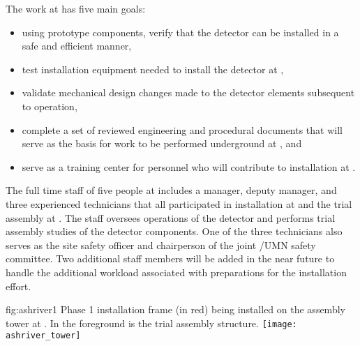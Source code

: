 The work at  has five main goals:
\begin{itemize}
  \item using prototype  components, verify that the
     detector can be installed in a safe and efficient
    manner,
    \item test installation equipment needed to install the
       detector at ,
  \item validate mechanical design changes made to the detector
    elements subsequent to  operation,
  \item complete a set of reviewed engineering and procedural
    documents that will serve as the basis for work to be performed
    underground at , and
  \item serve as a training center for personnel who will 
    contribute to   installation at .
\end{itemize}

The full time staff of five people at 
includes a manager, deputy manager, and three experienced technicians
that all participated in  installation at  and
the  trial assembly at .  The staff
oversees operations of the  detector and performs trial
assembly studies of the  detector components.  One of the
three technicians also serves as the site safety officer and
chairperson of the joint /UMN safety committee.  Two additional staff
members will be added in the near future to handle the additional
workload associated with preparations for the 
installation effort.
\begin{dunefigure}
  {fig:ashriver1}
  {Phase 1  installation frame (in red) being installed on the
   assembly tower at . In the foreground is
  the  trial assembly structure.}
   \texttt{[image: ashriver\_tower]}
\end{dunefigure}

